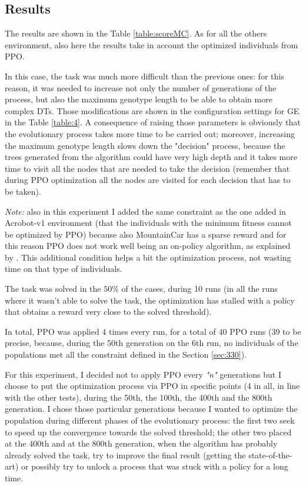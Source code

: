 \subsection{Results}
\label{subsec:433}
The results are shown in the Table \ref{table:scoreMC}. As for all the others environment, also here the results take in account the optimized individuals from PPO.

In this case, the task was much more difficult than the previous ones: for this reason, it was needed to increase not only the number of generations of the process, but also the maximum genotype length to be able to obtain more complex DTs. Those modifications are shown in the configuration settings for GE in the Table \ref{table:4}. A consequence of raising those parameters is obviously that the evolutionary process takes more time to be carried out; moreover, increasing the maximum genotype length slows down the "decision" process, because the trees generated from the algorithm could have very high depth and it takes more time to visit all the nodes that are needed to take the decision (remember that during PPO optimization all the nodes are visited for each decision that has to be taken).

\textit{Note:} also in this experiment I added the same constraint as the one added in Acrobot-v1 environment (that the individuals with the minimum fitness cannot be optimized by PPO) because also MountainCar has a sparse reward and for this reason PPO does not work well being an on-policy algorithm, as explained by \cite{ppo_mountaincar}. This additional condition helps a bit the optimization process, not wasting time on that type of individuals.

The task was solved in the $50\%$ of the cases, during 10 runs (in all the runs where it wasn't able to solve the task, the optimization has stalled with a policy that obtains a reward very close to the solved threshold).

In total, PPO was applied 4 times every run, for a total of 40 PPO runs (39 to be precise, because, during the 50th generation on the 6th run, no individuals of the populations met all the constraint defined in the Section \ref{sec:330}).

For this experiment, I decided not to apply PPO every \textit{"n"} generations but I choose to put the optimization process via PPO in specific points (4 in all, in line with the other tests), during the 50th, the 100th, the 400th and the 800th generation. I chose those particular generations because I wanted to optimize the population during different phases of the evolutionary process: the first two seek to speed up the convergence towards the solved threshold; the other two placed at the 400th and at the 800th generation, when the algorithm has probably already solved the task, try to improve the final result (getting the state-of-the-art) or possibly try to unlock a process that was stuck with a policy for a long time.

